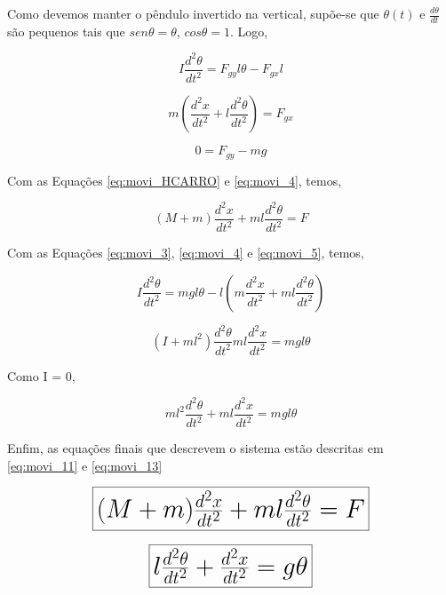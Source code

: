 \documentclass[a4paper, 12pt]{article}
\begin{document}
Como devemos manter o pêndulo invertido na vertical, supõe-se que $\theta(t)$ e $\frac{d\theta}{dt}$ são
pequenos tais que $sen\theta = \theta$, $cos\theta = 1$. Logo,


\begin{equation}\label{eq:movi_3}
    I\frac{d^2\theta}{dt^2} = F_{gy}l\theta - F_{gx}l
\end{equation}

\begin{equation}\label{eq:movi_4}
    m(\frac{d^2x}{dt^2} + l\frac{d^2\theta}{dt^2}) = F_{gx}
\end{equation}

\begin{equation}\label{eq:movi_5}
    0 = F_{gy} - mg
\end{equation}

Com as Equações \ref{eq:movi_HCARRO} e \ref{eq:movi_4}, temos,

\begin{equation}\label{eq:movi_6}
    (M + m)\frac{d^2x}{dt^2} + ml\frac{d^2\theta}{dt^2} = F
\end{equation}

Com as Equações \ref{eq:movi_3}, \ref{eq:movi_4} e \ref{eq:movi_5}, temos,

\begin{equation}\label{eq:cd}
    I\frac{d^2\theta}{dt^2} = mgl\theta - l(m\frac{d^2x}{dt^2} + ml\frac{d^2\theta}{dt^2})
\end{equation}

\begin{equation}\label{eq:cd}
    (I + ml^2)\frac{d^2\theta}{dt^2} ml\frac{d^2x}{dt^2} = mgl\theta
\end{equation}

Como I = 0,

\begin{equation}\label{eq:movi_10}
    ml^2\frac{d^2\theta}{dt^2} + ml\frac{d^2x}{dt^2} = mgl\theta
\end{equation}

Enfim, as equações finais que descrevem o sistema estão descritas em \ref{eq:movi_11} e \ref{eq:movi_13}

\begin{equation}\label{eq:movi_11}
    \fbox {\huge$ (M + m)\frac{d^2x}{dt^2} + ml\frac{d^2\theta}{dt^2} = F$}
\end{equation}

\begin{equation}\label{eq:movi_13}
    \fbox {\huge $  l\frac{d^2\theta}{dt^2} + \frac{d^2x}{dt^2} = g\theta $}
\end{equation}
\end{document}
